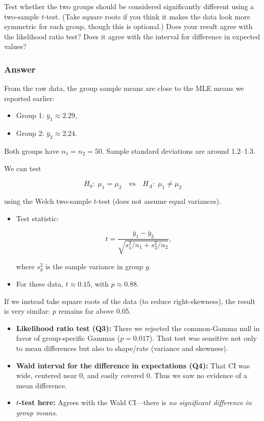 \documentclass[
]{article}
\providecommand{\tightlist}{%
  \setlength{\itemsep}{0pt}\setlength{\parskip}{0pt}}
\begin{document}
Test whether the two groups should be considered significantly different
using a two-sample \(t\)-test. (Take square roots if you think it makes
the data look more symmetric for each group, though this is optional.)
Does your result agree with the likelihood ratio test? Does it agree
with the interval for difference in expected values?

\subsubsection{Answer}\label{answer-4}

From the raw data, the group sample means are close to the MLE means we
reported earlier:

\begin{itemize}
\tightlist
\item
  Group 1: \(\bar y_1 \approx 2.29\),
\item
  Group 2: \(\bar y_2 \approx 2.24\).
\end{itemize}

Both groups have \(n_1=n_2=50\). Sample standard deviations are around
1.2--1.3.

We can test

\[
H_0:\; \mu_1=\mu_2 \quad\text{vs}\quad H_A:\; \mu_1\ne \mu_2
\]

using the Welch two-sample \(t\)-test (does not assume equal variances).

\begin{itemize}
\item
  Test statistic:

  \[
  t = \frac{\bar y_1-\bar y_2}{\sqrt{s_1^2/n_1 + s_2^2/n_2}},
  \]

  where \(s_g^2\) is the sample variance in group \(g\).
\item
  For these data, \(t\approx 0.15\), with \(p\approx 0.88\).
\end{itemize}

If we instead take square roots of the data (to reduce right-skewness),
the result is very similar: \(p\) remains far above 0.05.

\begin{itemize}
\tightlist
\item
  \textbf{Likelihood ratio test (Q3):} There we rejected the
  common-Gamma null in favor of group-specific Gammas (\(p=0.017\)).
  That test was sensitive not only to mean differences but also to
  shape/rate (variance and skewness).
\item
  \textbf{Wald interval for the difference in expectations (Q4):} That
  CI was wide, centered near 0, and easily covered 0. Thus we saw no
  evidence of a mean difference.
\item
  \textbf{\(t\)-test here:} Agrees with the Wald CI---there is \emph{no
  significant difference in group means}.
\end{itemize}
\end{document}
